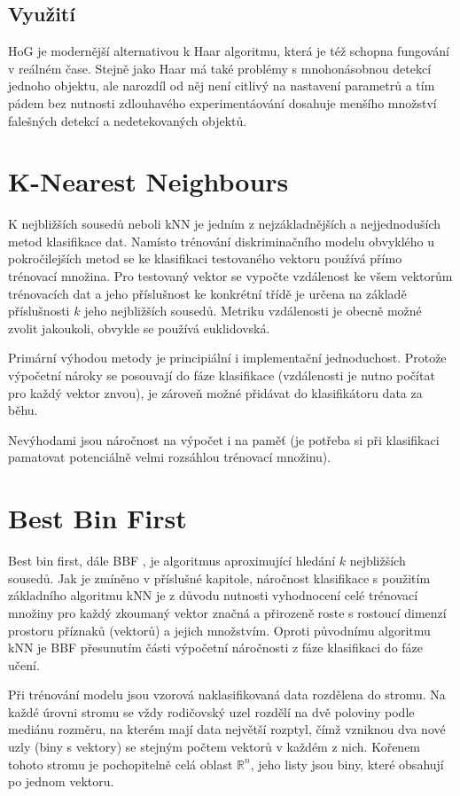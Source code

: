 	\subsection{Využití}
	
	HoG je modernější alternativou k Haar algoritmu, která je též schopna fungování v reálném čase. Stejně jako Haar má také problémy s mnohonásobnou detekcí jednoho objektu, ale narozdíl od něj není citlivý na nastavení parametrů a tím pádem bez nutnosti zdlouhavého experimentáování dosahuje menšího množství falešných detekcí a nedetekovaných objektů.


\section{K-Nearest Neighbours}

	K nejbližších sousedů neboli kNN je jedním z nejzákladnějších a nejjednoduších metod klasifikace dat. Namísto trénování diskriminačního modelu obvyklého u pokročilejších metod se ke klasifikaci testovaného vektoru používá přímo trénovací množina. Pro testovaný vektor se vypočte vzdálenost ke všem vektorům trénovacích dat a jeho příslušnost ke konkrétní třídě je určena na základě příslušnosti $k$ jeho nejbližších sousedů. Metriku vzdálenosti je obecně možné zvolit jakoukoli, obvykle se používá euklidovská.
	
	Primární výhodou metody je principiální i implementační jednoduchost. Protože výpočetní nároky se posouvají do fáze klasifikace (vzdálenosti je nutno počítat pro každý vektor znvou), je zároveň možné přidávat do klasifikátoru data za běhu.
	
	Nevýhodami jsou náročnost na výpočet i na paměť (je potřeba si při klasifikaci pamatovat potenciálně velmi rozsáhlou trénovací množinu).
	
\section{Best Bin First}
\label{sec:bbf}
	Best bin first, dále BBF \cite{beis1997shape}, je algoritmus aproximující hledání $k$ nejbližších sousedů. Jak je zmíněno v příslušné kapitole, náročnost klasifikace s použitím základního algoritmu kNN je z důvodu nutnosti vyhodnocení celé trénovací množiny pro každý zkoumaný vektor značná a přirozeně roste s rostoucí dimenzí prostoru příznaků (vektorů) a jejich množstvím. Oproti původnímu algoritmu kNN je BBF přesunutím části výpočetní náročnosti z fáze klasifikaci do fáze učení.
	
	Při trénování modelu jsou vzorová naklasifikovaná data rozdělena do stromu. Na každé úrovni stromu se vždy rodičovský uzel rozdělí na dvě poloviny podle mediánu rozměru, na kterém mají data největší rozptyl, čímž vzniknou dva nové uzly (biny s vektory) se stejným počtem vektorů v každém z nich. Kořenem tohoto stromu je pochopitelně celá oblast $\mathbb{R}^n$, jeho listy jsou biny, které obsahují po jednom vektoru.
	
